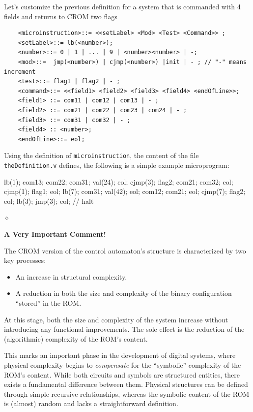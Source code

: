 \begin{exemplu}\label{dummyMP}
Let's customize the previous definition for a system that is commanded with 4 fields and returns to CROM two flags
 {\small
\begin{verbatim}
    <microinstruction>::= <<setLabel> <Mod> <Test> <Command>> ;
    <setLabel>::= lb(<number>);
    <number>::= 0 | 1 | ... | 9 | <number><number> | -;
    <mod>::=  jmp(<number>) | cjmp(<number>) |init | - ; // "-" means increment
    <test>::= flag1 | flag2 | - ;
    <command>::= <<field1> <field2> <field3> <field4> <endOfLine>>;
    <field1> ::= com11 | com12 | com13 | - ;
    <field2> ::= com21 | com22 | com23 | com24 | - ;
    <field3> ::= com31 | com32 | - ;
    <field4> :: <number>;
    <endOfLine>::= eol;
\end{verbatim}
}
Using the definition of {\tt microinstruction}, the content of the file {\tt theDefinition.v} defines, the following is a simple example microprogram:

{\em 
\begin{verilogcode}
    lb(1);  com13; com22; com31; val(24); eol;
            cjmp(3); flag2; com21; com32; eol;
            cjmp(1); flag1; eol;
    lb(7);  com31; val(42); eol;
            com12; com21; eol;
            cjmp(7); flag2; eol;
    lb(3);  jmp(3); eol;    // halt
\end{verilogcode}
}

$\diamond$
\end{exemplu}

{\bf A Very Important Comment!}

The CROM version of the control automaton's structure is characterized by two key processes:
\begin{itemize}
    \item An increase in structural complexity.
    \item A reduction in both the size and complexity of the 
    binary configuration ``stored'' in the ROM.
\end{itemize}

At this stage, both the size and complexity of the system increase without introducing any functional improvements. The sole effect is the reduction of the (algorithmic) complexity of the ROM's content.

This marks an important phase in the development of digital systems, where physical complexity begins to {\em compensate} for the ``symbolic'' complexity of the ROM's content. While both circuits and symbols are structured entities, there exists a fundamental difference between them. Physical structures can be defined through simple recursive relationships, whereas the symbolic content of the ROM is (almost) random and lacks a straightforward definition.

